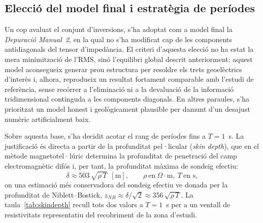 
\subsection{Elecció del model final i estratègia de períodes}

Un cop avaluat el conjunt d'inversions, s'ha adoptat com a model final la
\emph{Depuració Manual~2}, en la qual no s'ha modificat cap de les components
antidiagonals del tensor d'impedància. El criteri d'aquesta elecció no ha estat la
mera minimització de l'RMS, sinó l'equilibri global descrit anteriorment: aquest
model aconsegueix generar prou estructura per resoldre els trets geoelèctrics
d'interès i, alhora, reprodueix un resultat fortament comparable amb l'estudi de
referència, sense recórrer a l'eliminació ni a la devaluació de la informació
tridimensional continguda a les components diagonals. En altres paraules, s'ha
prioritzat un model honest i geològicament plausible per damunt d'un desajust
numèric artificialment baix.

Sobre aquesta base, s'ha decidit acotar el rang de períodes fins a $T = 1$~s. La
justificació és directa a partir de la profunditat pel·licular (\emph{skin depth}),
que en el mètode magnetotel·lúric determina la profunditat de penetració del camp
electromagnètic difós i, per tant, la profunditat màxima de sondeig efectiu:
%
\begin{equation}
    \delta \approx 503\,\sqrt{\rho\,T}\ \ [\text{m}],
    \qquad \rho\ \text{en}\ \Omega\!\cdot\!\text{m},\ T\ \text{en s},
    \label{eq:skindepth}
\end{equation}
%
on una estimació més conservadora del sondeig efectiu ve donada per la profunditat de
Niblett--Bostick, $z_{NB} \approx \delta/\sqrt{2} \approx 356\,\sqrt{\rho\,T}$. La
taula~\ref{tab:skindepth} recull tots dos valors a $T = 1$~s per a un ventall de
resistivitats representatiu del recobriment de la zona d'estudi.

